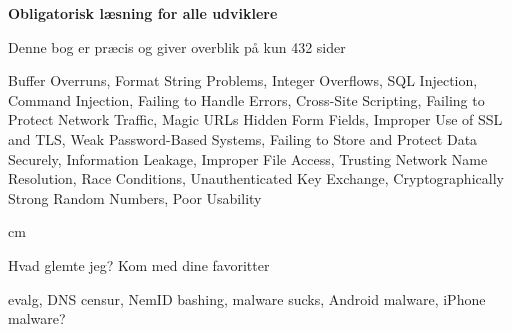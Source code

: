 \documentclass[20pt,landscape,a4paper,footrule]{foils}
\begin{document}
\begin{list1}
\item {\bf Obligatorisk læsning for alle udviklere}
\item Denne bog er præcis og giver overblik på kun 432 sider
\item Buffer Overruns, Format String Problems, Integer Overflows, SQL Injection, Command Injection,
Failing to Handle Errors, Cross-Site Scripting, Failing to Protect Network Traffic, Magic URLs Hidden Form Fields,
Improper Use of SSL and TLS, Weak Password-Based Systems, Failing to Store and Protect Data Securely, Information
Leakage, Improper File Access, Trusting Network Name Resolution, Race Conditions, Unauthenticated Key Exchange, Cryptographically Strong Random Numbers, Poor Usability
\end{list1}



 cm

\centerline{\Large Hvad glemte jeg? Kom med dine favoritter \smiley}

evalg, DNS censur, NemID bashing, malware sucks, Android malware, iPhone malware?


\myquestionspage
\end{document}
